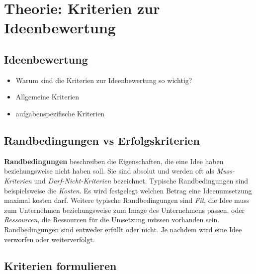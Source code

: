 \section{Theorie: Kriterien zur Ideenbewertung}\label{sec:kaptiel}

\subsection{Ideenbewertung}
\begin{itemize}
    \item Warum sind die Kriterien zur Ideenbewertung so wichtig?
    \item Allgemeine Kriterien
    \item aufgabenspezifische Kriterien
\end{itemize}
\subsection{Randbedingungen vs Erfolgskriterien}
\textbf{Randbedingungen} beschreiben die Eigenschaften, die eine Idee haben beziehungsweise
nicht haben soll. Sie sind absolut und werden oft als \textit{Muss-Kriterien}
und \textit{Darf-Nicht-Kriterien} bezeichnet.
Typische Randbedingungen sind beispielsweise die \textit{Kosten}. 
Es wird festgelegt welchen Betrag eine Ideenumsetzung maximal kosten darf. 
Weitere typische Randbedingungen sind \textit{Fit}, die Idee muss zum Unternehmen 
beziehungsweise zum Image des Unternehmens passen, oder \textit{Ressourcen}, die Ressourcen für die
Umsetzung müssen vorhanden sein. 
Randbedingungen sind entweder erfüllt oder nicht. Je nachdem wird eine Idee verworfen oder 
weiterverfolgt.


\subsection{Kriterien formulieren}